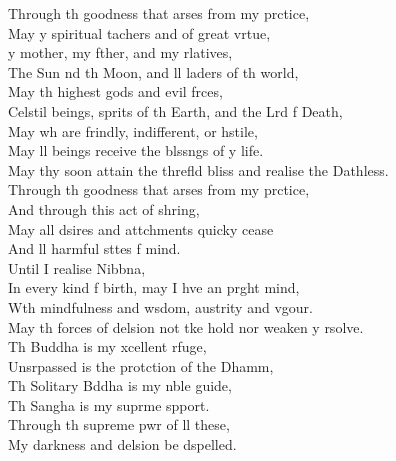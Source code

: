 \begin{leader}
\end{leader}

Through th goodness that arses from my prctice,\\
May y spiritual tachers and  of great vrtue,\\
y mother, my fther, and my rlatives,\\
The Sun nd th Moon, and ll  laders of th world,\\
May th highest gods and evil frces,\\
Celstil beings,  sprits of th Earth, and the Lrd f Death,\\
May  wh are frindly, indifferent, or hstile,\\
May ll beings receive the blssngs of y life.\\
May thy soon attain the threfld bliss and realise the Dathless.\\
Through th goodness that arses from my prctice,\\
And through this act of shring,\\
May all dsires and attchments quicky cease\\
And ll harmful sttes f mind.\\
Until I realise Nibbna,\\
In every kind f birth, may I hve an prght mind,\\
Wth mindfulness and wsdom, austrity and vgour.\\
May th forces of delsion not tke hold nor weaken y rsolve.\\
Th Buddha is my xcellent rfuge,\\
Unsrpassed is the protction of the Dhamm,\\
Th Solitary Bddha is my nble guide,\\
Th Sangha is my suprme spport.\\
Through th supreme pwr of ll these,\\
My darkness and delsion be dspelled.

